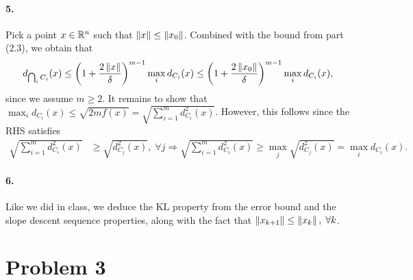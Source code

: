 \documentclass[10pt]{article}
\begin{document}
\paragraph{5.}
Pick a point $x \in \mathbb{R}^n$ such that $\left \| x \right \| \leq \left \| x_0 \right \|$. Combined with
the bound from part (2.3), we obtain that
\[
    d_{\operatorname*{\bigcap}_i C_i}(x) \leq \left(1 + \frac{2 \left \| x \right \|}{\delta}\right)^{m-1}
    \max_i d_{C_i}(x) \leq \left(1 + \frac{2 \left \| x_0 \right \|}{\delta}\right)^{m-1}
    \max_i d_{C_i}(x),
\]
since we assume $m \geq 2$. It remains to show that $\max_i d_{C_i}(x) \leq 
\sqrt{2 m f(x)} = \sqrt{\sum_{i=1}^m d_{C_i}^2(x)}$. However, this follows
since the RHS satisfies
\begin{align*}
    \sqrt{\sum_{i=1}^m d_{C_i}^2(x)} &\geq \sqrt{d_{C_j}^2(x)}, \; \forall j
    \Rightarrow \sqrt{\sum_{i=1}^m d_{C_i}^2(x)} \geq \max_j \sqrt{d_{C_j}^2(x)}
    = \max_i d_{C_i}(x).
\end{align*}

\paragraph{6.}
Like we did in class, we deduce the KL property from the error bound and the
slope descent sequence properties, along with the fact that $\left \| x_{k+1} \right \|
\leq \left \| x_{k} \right \|, \; \forall k$.
\section*{Problem 3}
\end{document}
